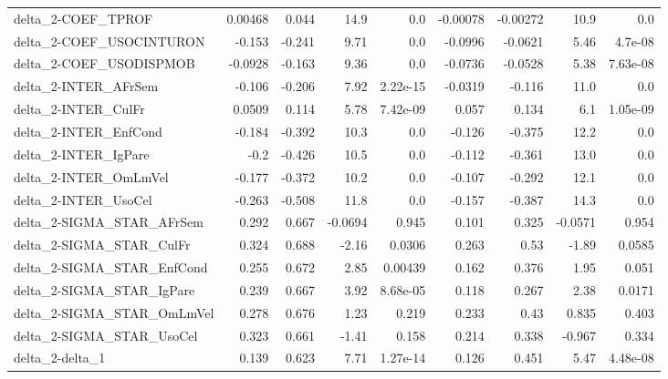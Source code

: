 \begin{tabular}{lrrrrrrrr}
delta\_2-COEF\_TPROF                    &     0.00468 &        0.044 &    14.9 &      0.0 &   -0.00078 &    -0.00272 &         10.9 &           0.0 \\
delta\_2-COEF\_USOCINTURON              &      -0.153 &       -0.241 &    9.71 &      0.0 &    -0.0996 &     -0.0621 &         5.46 &       4.7e-08 \\
delta\_2-COEF\_USODISPMOB               &     -0.0928 &       -0.163 &    9.36 &      0.0 &    -0.0736 &     -0.0528 &         5.38 &      7.63e-08 \\
delta\_2-INTER\_AFrSem                  &      -0.106 &       -0.206 &    7.92 & 2.22e-15 &    -0.0319 &      -0.116 &         11.0 &           0.0 \\
delta\_2-INTER\_CulFr                   &      0.0509 &        0.114 &    5.78 & 7.42e-09 &      0.057 &       0.134 &          6.1 &      1.05e-09 \\
delta\_2-INTER\_EnfCond                 &      -0.184 &       -0.392 &    10.3 &      0.0 &     -0.126 &      -0.375 &         12.2 &           0.0 \\
delta\_2-INTER\_IgPare                  &        -0.2 &       -0.426 &    10.5 &      0.0 &     -0.112 &      -0.361 &         13.0 &           0.0 \\
delta\_2-INTER\_OmLmVel                 &      -0.177 &       -0.372 &    10.2 &      0.0 &     -0.107 &      -0.292 &         12.1 &           0.0 \\
delta\_2-INTER\_UsoCel                  &      -0.263 &       -0.508 &    11.8 &      0.0 &     -0.157 &      -0.387 &         14.3 &           0.0 \\
delta\_2-SIGMA\_STAR\_AFrSem             &       0.292 &        0.667 & -0.0694 &    0.945 &      0.101 &       0.325 &      -0.0571 &         0.954 \\
delta\_2-SIGMA\_STAR\_CulFr              &       0.324 &        0.688 &   -2.16 &   0.0306 &      0.263 &        0.53 &        -1.89 &        0.0585 \\
delta\_2-SIGMA\_STAR\_EnfCond            &       0.255 &        0.672 &    2.85 &  0.00439 &      0.162 &       0.376 &         1.95 &         0.051 \\
delta\_2-SIGMA\_STAR\_IgPare             &       0.239 &        0.667 &    3.92 & 8.68e-05 &      0.118 &       0.267 &         2.38 &        0.0171 \\
delta\_2-SIGMA\_STAR\_OmLmVel            &       0.278 &        0.676 &    1.23 &    0.219 &      0.233 &        0.43 &        0.835 &         0.403 \\
delta\_2-SIGMA\_STAR\_UsoCel             &       0.323 &        0.661 &   -1.41 &    0.158 &      0.214 &       0.338 &       -0.967 &         0.334 \\
delta\_2-delta\_1                       &       0.139 &        0.623 &    7.71 & 1.27e-14 &      0.126 &       0.451 &         5.47 &      4.48e-08 \\
\bottomrule
\end{tabular}
